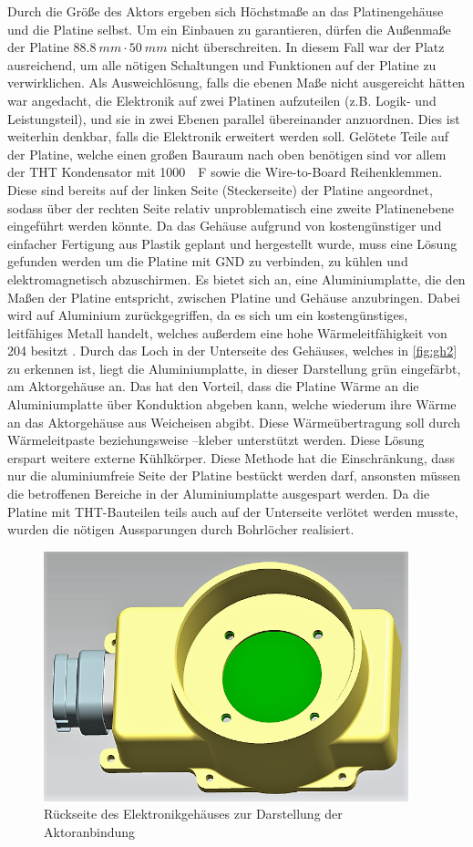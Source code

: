 Durch die Größe des Aktors ergeben sich Höchstmaße an das Platinengehäuse und die Platine selbst. Um ein Einbauen zu garantieren, dürfen die Außenmaße der Platine $\SI{88,8}{mm} \cdot \SI{50}{mm}$ nicht überschreiten. In diesem Fall war der Platz ausreichend, um alle nötigen Schaltungen und Funktionen auf der Platine zu verwirklichen. Als Ausweichlösung, falls die ebenen Maße nicht ausgereicht hätten war angedacht, die Elektronik auf zwei Platinen aufzuteilen (z.B. Logik- und Leistungsteil), und sie in zwei Ebenen parallel übereinander anzuordnen. Dies ist weiterhin denkbar, falls die Elektronik erweitert werden soll. Gelötete Teile auf der Platine, welche einen großen Bauraum nach oben benötigen sind vor allem der THT Kondensator mit \SI{1000}{\mu F} sowie die Wire-to-Board Reihenklemmen. Diese sind bereits auf der linken Seite (Steckerseite) der Platine angeordnet, sodass über der rechten Seite relativ unproblematisch eine zweite Platinenebene eingeführt werden könnte.
Da das Gehäuse aufgrund von kostengünstiger und einfacher Fertigung aus Plastik geplant und hergestellt wurde, muss eine Lösung gefunden werden um die Platine mit GND zu verbinden, zu kühlen und elektromagnetisch abzuschirmen. Es bietet sich an, eine Aluminiumplatte, die den Maßen der Platine entspricht, zwischen Platine und Gehäuse anzubringen. Dabei wird auf Aluminium zurückgegriffen, da es sich um ein kostengünstiges, leitfähiges Metall handelt, welches außerdem eine hohe Wärmeleitfähigkeit von \SI{204}{} besitzt \cite[S.4]{wuerth}. 
Durch das Loch in der Unterseite des Gehäuses, welches in \autoref{fig:gh2} zu erkennen ist, liegt die Aluminiumplatte, in dieser Darstellung grün eingefärbt, am Aktorgehäuse an. Das hat den Vorteil, dass die Platine Wärme an die Aluminiumplatte über Konduktion abgeben kann, welche wiederum ihre Wärme an das Aktorgehäuse aus Weicheisen abgibt. Diese Wärmeübertragung soll durch Wärmeleitpaste beziehungsweise –kleber unterstützt werden. Diese Lösung erspart weitere externe Kühlkörper. Diese Methode hat die Einschränkung, dass nur die aluminiumfreie Seite der Platine bestückt werden darf, ansonsten müssen die betroffenen Bereiche in der Aluminiumplatte ausgespart werden. Da die Platine mit THT-Bauteilen teils auch auf der Unterseite verlötet werden musste, wurden die nötigen Aussparungen durch Bohrlöcher realisiert. 
\begin{figure}[H]%
\centering
\includegraphics[width=300pt]{./Bilder/Elektronik_Gehauese}%
\caption{Rückseite des Elektronikgehäuses zur Darstellung der Aktoranbindung}%
\label{fig:gh2}%
\end{figure}
